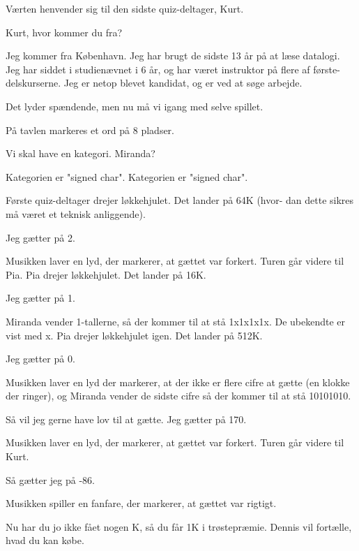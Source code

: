 \documentclass[a4paper,11pt]{article}
\begin{document}
\begin{sketch}
\scene Værten henvender sig til den sidste quiz-deltager, Kurt.

      Kurt, hvor kommer du fra?

        Jeg kommer fra København. Jeg har brugt de sidste 13
             år på at læse datalogi. Jeg har siddet i studienævnet
             i 6 år, og har været instruktor på flere af første-
             delskurserne. Jeg er netop blevet kandidat, og er ved
             at søge arbejde.

      Det lyder spændende, men nu må vi igang med selve
             spillet.

\scene På tavlen markeres et ord på 8 pladser.

      Vi skal have en kategori. Miranda?

      Kategorien er "signed char". Kategorien er "signed
             char".

\scene Første quiz-deltager drejer løkkehjulet. Det lander på 64K (hvor-
dan dette sikres må været et teknisk anliggende).

        Jeg gætter på 2.

\scene Musikken laver en lyd, der markerer, at gættet var forkert. Turen
går videre til Pia. Pia drejer løkkehjulet. Det lander på 16K.

         Jeg gætter på 1.

\scene Miranda vender 1-tallerne, så der kommer til at stå 1x1x1x1x. De
ubekendte er vist med x. Pia drejer løkkehjulet igen. Det lander
på 512K.

         Jeg gætter på 0.

\scene Musikken laver en lyd der markerer, at der ikke er flere cifre at
gætte (en klokke der ringer), og Miranda vender de sidste cifre
så der kommer til at stå 10101010.

         Så vil jeg gerne have lov til at gætte. Jeg gætter
             på 170.

\scene Musikken laver en lyd, der markerer, at gættet var forkert. Turen
går videre til Kurt.

        Så gætter jeg på -86.

\scene Musikken spiller en fanfare, der markerer, at gættet var rigtigt.

      Nu har du jo ikke fået nogen K, så du får 1K i
             trøstepræmie. Dennis vil fortælle, hvad du kan
             købe.


\end{sketch}
\end{document}
